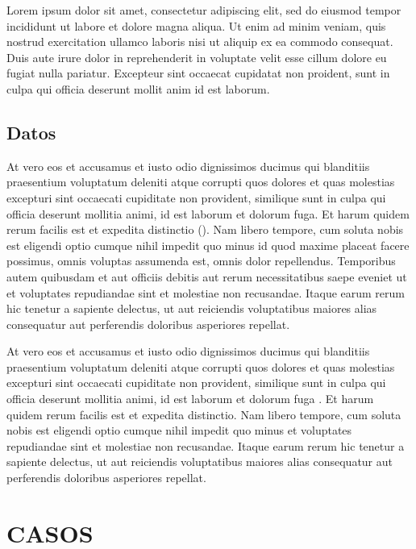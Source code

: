 \documentclass[12pt]{article} %
\begin{document}
Lorem ipsum dolor sit amet, consectetur adipiscing elit, sed do eiusmod tempor incididunt ut labore et dolore magna aliqua. Ut enim ad minim veniam, quis nostrud exercitation ullamco laboris nisi ut aliquip ex ea commodo consequat. Duis aute irure dolor in reprehenderit in voluptate velit esse cillum dolore eu fugiat nulla pariatur. Excepteur sint occaecat cupidatat non proident, sunt in culpa qui officia deserunt mollit anim id est laborum.

\subsection*{Datos} 
At vero eos et accusamus et iusto odio dignissimos ducimus qui blanditiis praesentium voluptatum deleniti atque corrupti quos dolores et quas molestias excepturi sint occaecati cupiditate non provident, similique sunt in culpa qui officia deserunt mollitia animi, id est laborum et dolorum fuga. Et harum quidem rerum facilis est et expedita distinctio (\citealp{dunning_design-based_2010,brady_rethinking_2010,calvo_ballot_2009}). Nam libero tempore, cum soluta nobis est eligendi optio cumque nihil impedit quo minus id quod maxime placeat facere possimus, omnis voluptas assumenda est, omnis dolor repellendus. Temporibus autem quibusdam et aut officiis debitis aut rerum necessitatibus saepe eveniet ut et voluptates repudiandae sint et molestiae non recusandae. Itaque earum rerum hic tenetur a sapiente delectus, ut aut reiciendis voluptatibus maiores alias consequatur aut perferendis doloribus asperiores repellat.

At vero eos et accusamus et iusto odio dignissimos ducimus qui blanditiis praesentium voluptatum deleniti atque corrupti quos dolores et quas molestias excepturi sint occaecati cupiditate non provident, similique sunt in culpa qui officia deserunt mollitia animi, id est laborum et dolorum fuga \citet{}. Et harum quidem rerum facilis est et expedita distinctio. Nam libero tempore, cum soluta nobis est eligendi optio cumque nihil impedit quo minus et voluptates repudiandae sint et molestiae non recusandae. Itaque earum rerum hic tenetur a sapiente delectus, ut aut reiciendis voluptatibus maiores alias consequatur aut perferendis doloribus asperiores repellat.



\section{CASOS}
\end{document}
